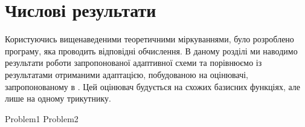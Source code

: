 
\section{Числові результати}

Користуючись вищенаведеними теоретичними міркуваннями, було розроблено програму, яка проводить відповідні обчислення.
В даному розділі ми наводимо результати роботи запропонованої адаптивної схеми та порівнюємо
	із результатами отриманими адаптацією, побудованою на оцінювачі, запропонованому в \cite{OstShynAee11}. Цей оцінювач будується на схожих базисних функціях, але лише на одному трикутнику.

{Problem1}
{Problem2}
